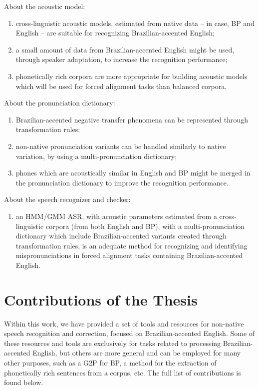 About the acoustic model:
\begin{enumerate}
 \item cross-linguistic acoustic models, estimated from native data -- in case, \ac{BP} and English -- are suitable for recognizing Brazilian-accented English;
 \item a small amount of data from Brazilian-accented English might be used, through speaker adaptation, to increase the recognition performance;
 \item phonetically rich corpora are more appropriate for building acoustic models which will be used for forced alignment tasks than balanced corpora.
\end{enumerate}
About the pronunciation dictionary:
\begin{enumerate}
 \item Brazilian-accented negative transfer phenomena can be represented through transformation rules;
 \item non-native pronunciation variants can be handled similarly to native variation, by using a  multi-pronunciation dictionary;
 \item phones which are acoustically similar in English and \ac{BP} might be merged in the pronunciation dictionary to improve the recognition performance.
\end{enumerate}
About the speech recognizer and checker:
\begin{enumerate}
 \item an HMM/GMM \ac{ASR}, with acoustic parameters estimated from a cross-linguistic corpora (from both English and \ac{BP}), with a multi-pronunciation dictionary which include Brazilian-accented variants created through transformation rules, is an adequate method for recognizing and identifying mispronunciations in forced alignment tasks containing Brazilian-accented English.
\end{enumerate}

\section{Contributions of the Thesis}

Within this work, we have provided a set of tools and resources for non-native speech recognition and correction, focused on Brazilian-accented English. Some of these resources and tools are exclusively for tasks related to processing Brazilian-accented English, but others are more general and can be employed for many other purposes, such as a \ac{G2P} for \ac{BP}, a method for the extraction of phonetically rich sentences from a corpus, etc. The full list of contributions is found below.

